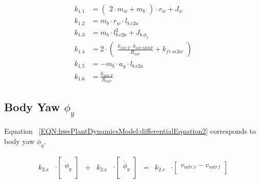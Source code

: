 \documentclass[crop=false,float=true,class=scrreprt]{standalone}
\begin{document}
\begin{align}
\displaystyle k_{1.1} & = \begin{pmatrix}\displaystyle
                          2 \cdot m_{w} + m_{b}
                          \end{pmatrix} 
                          \cdot r_{w} + J_{w}                                                       \\[+0.5em]
\displaystyle k_{1.2} & = m_{b} \cdot r_{w} \cdot l_{b.c2a}                                         \\[+0.5em]
\displaystyle k_{1.3} & = m_{b} \cdot l_{b.c2a}^{2}                            + J_{b.\phi_{x}}     \\[+0.5em]
\displaystyle k_{1.4} & = 2 \cdot \begin{pmatrix}\displaystyle 
                                  \frac{k_{mtr.T} \cdot k_{mtr.bEMF}}{R_{mtr}} + k_{fr.m2w}
                                  \end{pmatrix}                                                     \\[+0.5em]
\displaystyle k_{1.5} & = -m_{b} \cdot a_{g} \cdot l_{b.c2a}                                        \\[+0.5em]
\displaystyle k_{1.6} & = \frac{k_{mtr.T}}{R_{mtr}}
\end{align}




\clearpage




\subsection{Body Yaw $\phi_{y}$}
\label{SEC:hwePlantDynamicsModel:differentialEquations:phiY}

Equation~%
\eqref{EQN:hwePlantDynamicsModel:differentialEquation2}
corresponds to body yaw $\phi_{y}$.




\vspace{-1em}





\begin{equation}
\label{EQN:hwePlantDynamicsModel:differentialEquation2}
\begin{array}{ccccccccccc}
k_{2.\ddot{x}}
& \cdot 
\begin{bmatrix}
\ddot{\phi}_{y}\\
\end{bmatrix}
& + &
k_{2.\dot{x}} 
& \cdot 
\begin{bmatrix}
\dot{\phi}_{y}\\
\end{bmatrix}
& = &
k_{2.v}
& \cdot
\begin{bmatrix}
v_{mtr.r} - v_{mtr.l}\\
\end{bmatrix}
\end{array}
\end{equation}
\end{document}

